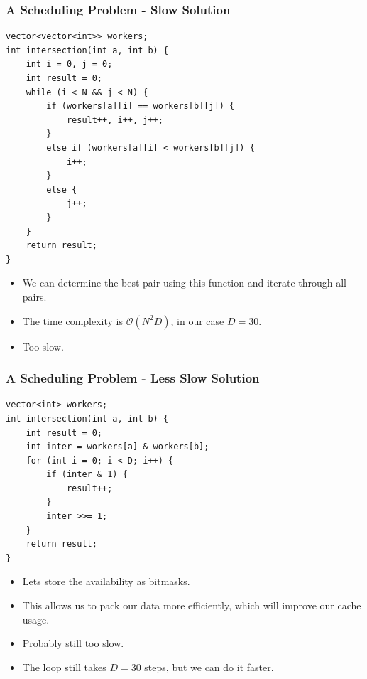 \documentclass[10pt]{beamer}
\begin{document}
\begin{frame}
	\frametitle{A Scheduling Problem - Slow Solution}
    \begin{scriptsize}
        \begin{verbatim}
vector<vector<int>> workers;
int intersection(int a, int b) {
    int i = 0, j = 0;
    int result = 0;
    while (i < N && j < N) {
        if (workers[a][i] == workers[b][j]) {
            result++, i++, j++;
        }
        else if (workers[a][i] < workers[b][j]) {
            i++;
        }
        else {
            j++;
        }
    }
    return result;
}
        \end{verbatim}
    \end{scriptsize}
    \begin{itemize}
        \item<2-> We can determine the best pair using this function and iterate through all pairs.
        \item<3-> The time complexity is $\mathcal{O}(N^2D)$, in our case $D=30$.
        \item<4-> Too slow.
    \end{itemize}
\end{frame}

\begin{frame}
	\frametitle{A Scheduling Problem - Less Slow Solution}
    \begin{scriptsize}
        \begin{verbatim}
vector<int> workers;
int intersection(int a, int b) {
    int result = 0;
    int inter = workers[a] & workers[b];
    for (int i = 0; i < D; i++) {
        if (inter & 1) {
            result++;
        }
        inter >>= 1;
    }
    return result;
}
        \end{verbatim}
    \end{scriptsize}
    \begin{itemize}
        \item Lets store the availability as bitmasks.
        \item<2-> This allows us to pack our data more efficiently, which will improve our cache usage.
        \item<3-> Probably still too slow.
        \item<4-> The loop still takes $D = 30$ steps, but we can do it faster.
    \end{itemize}
\end{frame}
\end{document}
